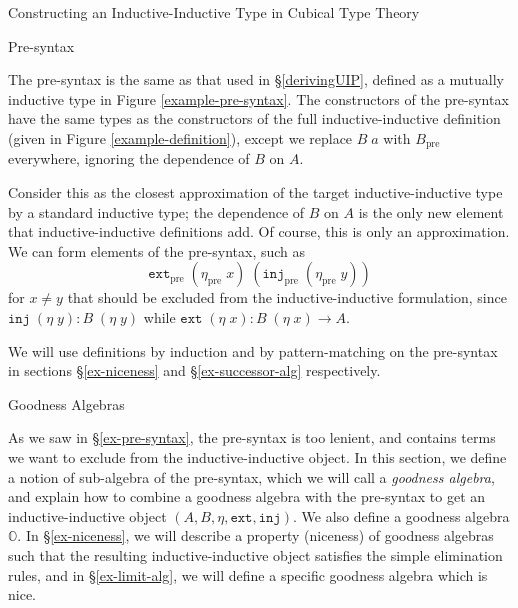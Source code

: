 \documentclass[runningheads]{llncs}
\newcommand{\erase}[1]{{}}
\newcommand{\pre}[1]{{#1}_\text{pre}}
\newcommand{\bbO}{\mathbb{O}}
\newcommand{\join}{\texttt{ext}}
\newcommand{\inj}{\texttt{inj}}
\begin{document}
\begin{section}{Constructing an Inductive-Inductive Type in Cubical Type Theory}
\erase{We will follow the same sequence of steps in \S\ref{construct-cubical}, where we perform the construction for arbitrary inductive-inductive definitions.}

\begin{subsection}{Pre-syntax}\label{ex-pre-syntax}

The pre-syntax is the same as that used in \S\ref{derivingUIP}, defined as a mutually inductive type in Figure \ref{example-pre-syntax}. The constructors of the pre-syntax have the same types as the constructors of the full inductive-inductive definition (given in Figure \ref{example-definition}), except we replace $B\;a$ with $\pre{B}$ everywhere, ignoring the dependence of $B$ on $A$.

Consider this as the closest approximation of the target inductive-inductive type by a standard inductive type; the dependence of $B$ on $A$ is the only new element that inductive-inductive definitions add. Of course, this is only an approximation. We can form elements of the pre-syntax, such as \[\pre{\join}\;(\pre{\eta}\;x)\;(\pre{\inj}\;(\pre{\eta}\;y))\] for $x \neq y$ that should be excluded from the inductive-inductive formulation, since $\inj\;(\eta\;y) : B\;(\eta\;y)$ while $\join\;(\eta\;x) : B\;(\eta\;x) \to A$.

We will use definitions by induction and by pattern-matching on the pre-syntax in sections \S\ref{ex-niceness} and \S\ref{ex-successor-alg} respectively.

\end{subsection}

\begin{subsection}{Goodness Algebras}\label{ex-goodness-algebra}

As we saw in \S\ref{ex-pre-syntax}, the pre-syntax is too lenient, and contains terms we want to exclude from the inductive-inductive object. In this section, we define a notion of sub-algebra of the pre-syntax, which we will call a \emph{goodness algebra}, and explain how to combine a goodness algebra with the pre-syntax to get an inductive-inductive object $(A, B, \eta, \join, \inj)$. We also define a goodness algebra $\bbO$. In \S\ref{ex-niceness}, we will describe a property (niceness) of goodness algebras such that the resulting inductive-inductive object satisfies the simple elimination rules, and in \S\ref{ex-limit-alg}, we will define a specific goodness algebra which is nice.

\begin{figure}[htb]\begin{flushleft}


\end{flushleft}
\end{figure}
\end{subsection}
\end{section}
\end{document}
